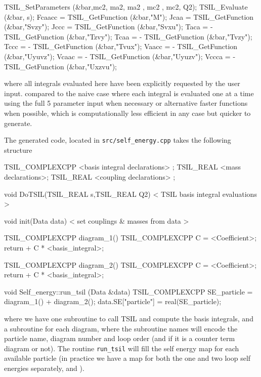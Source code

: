 \begin{lstcpp}
TSIL_SetParameters (&bar,mc2, ma2, ma2 , mc2 , mc2, Q2);
TSIL_Evaluate (&bar, s);
Fcaacc =   TSIL_GetFunction (&bar,"M");
Jcaa   =   TSIL_GetFunction (&bar,"Svzy");
Jccc   =   TSIL_GetFunction (&bar,"Svxu");
Taca   = - TSIL_GetFunction (&bar,"Tzvy");
Tcaa   = - TSIL_GetFunction (&bar,"Tvzy");
Tccc   = - TSIL_GetFunction (&bar,"Tvux");
Vaacc  = - TSIL_GetFunction (&bar,"Uyuvz");
Vcaac  = - TSIL_GetFunction (&bar,"Uyuzv");
Vccca  = - TSIL_GetFunction (&bar,"Uxzvu");
\end{lstcpp}
where all integrals evaluated here have been explicitly requested by the user input.
compared to the naive case where each integral is evaluated one at a time using the full 5 parameter input when necessary or alternative faster functions when possible, which is computationally less efficient in any case but quicker to generate.

The generated code, located in \lstinline{src/self_energy.cpp} takes the following structure
\begin{lstcpp}
TSIL_COMPLEXCPP  <basis integral declarations> ;
TSIL_REAL  <mass declarations>;
TSIL_REAL  <coupling declarations> ;

void DoTSIL(TSIL_REAL s,TSIL_REAL Q2)
{
	< TSIL basis integral evaluations >
}

void init(Data data) 
{
	< set couplings & masses from data >
}

TSIL_COMPLEXCPP  diagram_1()
{
	TSIL_COMPLEXCPP C =  <Coefficient>;
	return  + C * <basis_integral>;
}

TSIL_COMPLEXCPP  diagram_2()
{
	TSIL_COMPLEXCPP C =  <Coefficient>;
	return  + C * <basis_integral>;
}

void Self_energy::run_tsil (Data &data) 
{
	TSIL_COMPLEXCPP SE_particle = diagram_1() + diagram_2();
	data.SE["particle"] = real(SE_particle);
}
\end{lstcpp}

where we have one subroutine to call TSIL and compute the basis integrals, and a subroutine for each diagram, where the subroutine names will encode the particle name, diagram number and loop order (and if it is a counter term diagram or not).  The routine \lstinline{run_tsil} will fill the self energy map for each available particle (in practice we have a map for both the one and two loop self energies separately,  and ).

